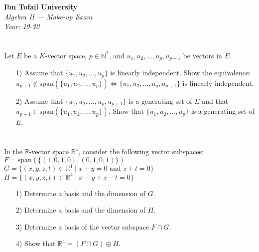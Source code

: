 \documentclass[12pt]{article}
\begin{document}
\begin{center}
  \Large\textbf{Ibn Tofail University} \\[1em]
  \large\textit{Algebra II — Make-up Exam} \\[0.5em]
  \large\textit{Year: 19-20} \\[2em]
\end{center}

\vspace{0.5cm}

\section{}
Let $E$ be a $K$-vector space, $p \in \mathbb{N}^*$, and $u_1, u_2, ..., u_p, u_{p+1}$ be vectors in $E$.

\begin{enumerate}
    \item[1)] Assume that $\{u_1, u_2, ..., u_p\}$ is linearly independent. Show the equivalence:\\
    $u_{p+1} \notin \text{span}(\{u_1, u_2, ..., u_p\}) \Leftrightarrow \{u_1, u_2, ..., u_p, u_{p+1}\}$ is linearly independent.
    
    \item[2)] Assume that $\{u_1, u_2, ..., u_p, u_{p+1}\}$ is a generating set of $E$ and that\\
    $u_{p+1} \in \text{span}(\{u_1, u_2, ..., u_p\})$. Show that $\{u_1, u_2, ..., u_p\}$ is a generating set of $E$.
\end{enumerate}


\begin{answerbox}
\end{answerbox}

\newpage  
\section{}
In the $\mathbb{R}$-vector space $\mathbb{R}^4$, consider the following vector subspaces:\\
$F = \text{span}(\{(1,0,1,0), (0,1,0,1)\})$\\
$G = \{(x,y,z,t) \in \mathbb{R}^4 \mid x + y = 0 \text{ and } z + t = 0\}$\\
$H = \{(x,y,z,t) \in \mathbb{R}^4 \mid x - y + z - t = 0\}$

\begin{enumerate}
    \item[1)] Determine a basis and the dimension of $G$.
    \item[2)] Determine a basis and the dimension of $H$.
    \item[3)] Determine a basis of the vector subspace $F \cap G$.
    \item[4)] Show that $\mathbb{R}^4 = (F \cap G) \oplus H$.
\end{enumerate}
\end{document}
